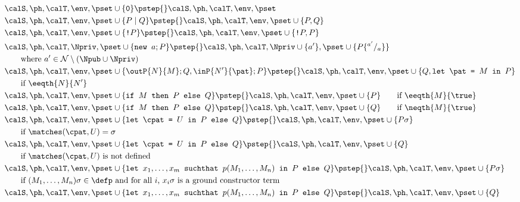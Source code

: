 \documentclass{book}
\begin{document}
\begin{figure}
\begin{align*}
&\calS, \ph, \calT, \env, \pset \cup \{ \texttt{0} \} \pstep{} \calS, \ph, \calT, \env, \pset\\
&\calS, \ph, \calT, \env, \pset \cup \{ P \mid Q \} \pstep{} \calS, \ph, \calT, \env, \pset \cup \{ P, Q\}\\
&\calS, \ph, \calT, \env, \pset \cup \{ \texttt{!} P \} \pstep{} \calS, \ph, \calT, \env, \pset \cup \{ \texttt{!} P, P \}\\
&\calS, \ph, \calT, \Npriv, \pset \cup \{ \texttt{new } a; P \} \pstep{} \calS, \ph, \calT, \Npriv \cup \{ a' \}, \pset \cup \{ P\{^{a'}/_a\} \}\\
&\qquad\text{where } a' \in \cal N \setminus (\Npub \cup \Npriv)\\
&\calS, \ph, \calT, \env, \pset \cup \{ \outP{N}{M}; Q, \inP{N'}{\pat};P \} \pstep{} \calS, \ph, \calT, \env, \pset \cup \{ Q, \texttt{let } \pat \texttt{ = } M \texttt{ in } P \}\\
&\qquad\text{if $\eeqth{N}{N'}$}\\
&\calS, \ph, \calT, \env, \pset \cup \{ \texttt{if } M \texttt{ then } P \texttt{ else } Q \} \pstep{} \calS, \ph, \calT, \env, \pset \cup \{  P \}\qquad\text{if $\eeqth{M}{\true}$}\\
&\calS, \ph, \calT, \env, \pset \cup \{ \texttt{if } M \texttt{ then } P \texttt{ else } Q \} \pstep{} \calS, \ph, \calT, \env, \pset \cup \{  Q \}\qquad\text{if $\neqth{M}{\true}$}\\
&\calS, \ph, \calT, \env, \pset \cup \{ \texttt{let } \cpat \texttt{ = } U \texttt{ in } P \texttt{ else } Q \} \pstep{} \calS, \ph, \calT, \env, \pset \cup \{ P\sigma \}\\
&\qquad\text{if $\matches(\cpat,U) = \sigma$}\\
&\calS, \ph, \calT, \env, \pset \cup \{ \texttt{let } \cpat \texttt{ = } U \texttt{ in } P \texttt{ else } Q \} \pstep{} \calS, \ph, \calT, \env, \pset \cup \{ Q \}\\
&\qquad\text{if $\matches(\cpat,U)$ is not defined}\\
&\calS, \ph, \calT, \env, \pset \cup \{ \texttt{let } x_1,\ldots,x_m \texttt{ suchthat } p(M_1,\ldots,M_n) \texttt{ in } P \texttt{ else } Q \} \pstep{} \calS, \ph, \calT, \env, \pset \cup \{ P\sigma \}\\
&\qquad\text{if $(M_1,\ldots,M_n)\sigma \in \defp$ and for all $i$, $x_i\sigma$ is a ground constructor term}\\
&\calS, \ph, \calT, \env, \pset \cup \{ \texttt{let } x_1,\ldots,x_m \texttt{ suchthat } p(M_1,\ldots,M_n) \texttt{ in } P \texttt{ else } Q \} \pstep{} \calS, \ph, \calT, \env, \pset \cup \{ Q \}\\

\end{align*}
\end{figure}
\end{document}
